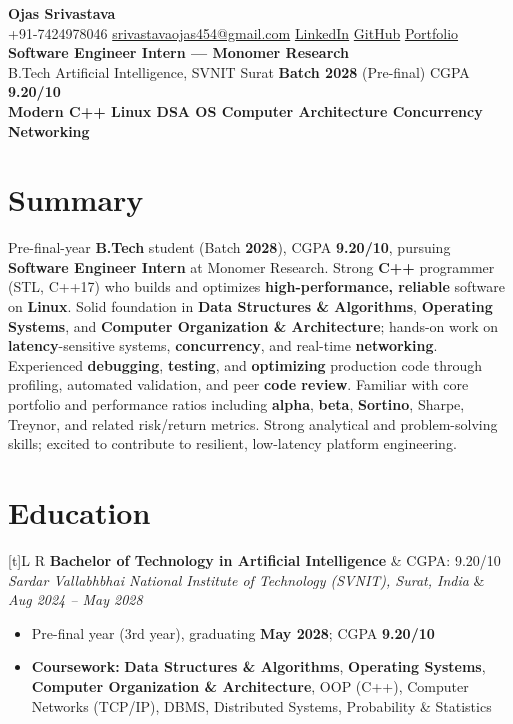 \documentclass[a4paper,10pt]{article}
\newcommand{\resumeSubheading}[4]{%
  \vspace{0.4mm}
  \noindent
  \begin{tabularx}{\textwidth}[t]{L R}
    \textbf{#1} & #4 \\
    \textit{#3} & \textit{#2} \\
  \end{tabularx}
  \vspace{-0.4mm}%
}
\begin{document}
\selectfont

\begin{center}
  {\LARGE \textbf{Ojas Srivastava}} \\[0.8mm]
  \small
  +91-7424978046 \textbar{}
  \href{mailto:srivastavaojas454@gmail.com}{srivastavaojas454@gmail.com} \textbar{}
  \href{https://linkedin.com/in/ojas-srivastava05}{LinkedIn} \textbar{}
  \href{https://github.com/Ojas-Srivastava05}{GitHub} \textbar{}
  \href{https://ojas-srivastava.vercel.app}{Portfolio} \\[0.3mm]
  \textbf{Software Engineer Intern --- Monomer Research} \\[0.2mm]
  B.Tech Artificial Intelligence, SVNIT Surat \textbar{}
  \textbf{Batch 2028} (Pre-final) \textbar{}
  CGPA \textbf{9.20/10} \\[0.2mm]
  \textbf{Modern C++ \textbar{} Linux \textbar{} DSA \textbar{} OS \textbar{} Computer Architecture \textbar{} Concurrency \textbar{} Networking}
\end{center}

\vspace{-0.8mm}

\section{Summary}
\small
Pre-final-year \textbf{B.Tech} student (Batch \textbf{2028}), CGPA \textbf{9.20/10}, pursuing \textbf{Software Engineer Intern} at Monomer Research. Strong \textbf{C++} programmer (STL, C++17) who builds and optimizes \textbf{high-performance, reliable} software on \textbf{Linux}. Solid foundation in \textbf{Data Structures \& Algorithms}, \textbf{Operating Systems}, and \textbf{Computer Organization \& Architecture}; hands-on work on \textbf{latency}-sensitive systems, \textbf{concurrency}, and real-time \textbf{networking}. Experienced \textbf{debugging}, \textbf{testing}, and \textbf{optimizing} production code through profiling, automated validation, and peer \textbf{code review}. Familiar with core portfolio and performance ratios including \textbf{alpha}, \textbf{beta}, \textbf{Sortino}, Sharpe, Treynor, and related risk/return metrics. Strong analytical and problem-solving skills; excited to contribute to resilient, low-latency platform engineering.

\section{Education}
\small
\resumeSubheading
  {Bachelor of Technology in Artificial Intelligence}{Aug 2024 -- May 2028}
  {Sardar Vallabhbhai National Institute of Technology (SVNIT), Surat, India}{CGPA: 9.20/10}
\begin{itemize}
  \item Pre-final year (3rd year), graduating \textbf{May 2028}; CGPA \textbf{9.20/10}
  \item \textbf{Coursework:} \textbf{Data Structures \& Algorithms}, \textbf{Operating Systems}, \textbf{Computer Organization \& Architecture}, OOP (C++), Computer Networks (TCP/IP), DBMS, Distributed Systems, Probability \& Statistics
\end{itemize}
\end{document}
